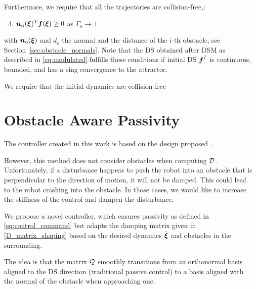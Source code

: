 \documentclass[conference]{IEEEtran}
\begin{document}
Furthermore, we require that all the trajectories are collision-free,: 
\begin{enumerate}
  \setcounter{enumi}{3}
  \item $\boldsymbol{n_o}(\boldsymbol{\xi})^T \boldsymbol{f}(\boldsymbol{\xi}) \geq 0$ as $\Gamma_o \rightarrow 1$
\end{enumerate}
with $\boldsymbol{n}_o (\boldsymbol{\xi})$ and $d_o$ the normal and the distance of the $i$-th obstacle, see Section~\ref{sec:obstacle_normals}. 
Note that the DS obtained after DSM as described in \eqref{eq:modulated} fulfills these conditions if initial DS $\boldsymbol{f}^I$ is continuous, bounded, and has a sing convergence to the attractor.

We require that the initial dynamics are collision-free


\section{Obstacle Aware Passivity} \label{sec:obstacle_aware_passivity}
The controller created in this work is based on the design proposed \cite{takegaki1981new,  kronander2015passive}.

However, this method does not consider obstacles when computing $\mathcal{D}$. Unfortunately, if a disturbance happens to push the robot into an obstacle that is perpendicular to the direction of motion, it will not be damped. This could lead to the robot crashing into the obstacle. In those cases, we would like to increase the stiffness of the control and dampen the disturbance.

We propose a novel controller, which ensures passivity as defined in \eqref{eq:control_command} but adapts the damping matrix given in \eqref{D_matrix_shaping} based on the desired dynamics $\dot{\boldsymbol{\xi}}$ and obstacles in the surrounding. 

The idea is that the matrix $\mathcal{Q}$ smoothly transitions from an orthonormal basis aligned to the DS direction (traditional passive control) to a basis aligned with the normal of the obstacle when approaching one.
\end{document}
